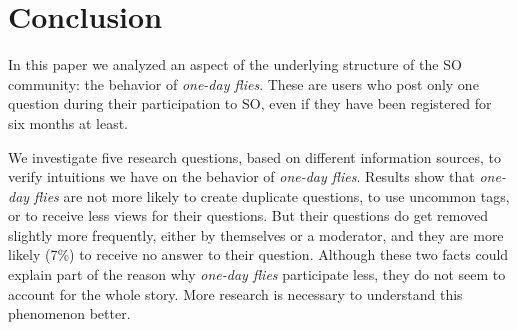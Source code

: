 \documentclass[conference]{IEEEtran}
\newcommand\odf{\emph{one-day flies}\xspace}
\begin{document}
\section{Conclusion}

In this paper we analyzed an aspect of the underlying structure of the
SO community: the behavior of \odf. These are users who post only one question
during their participation to SO, even if they have been registered for six 
months at least. 

We investigate five research questions, based on different information sources,
to verify intuitions we have on the behavior of \odf. Results show that \odf
are not more likely to create duplicate questions, to use uncommon tags, or to
receive less views for their questions. But their questions do get removed
slightly more frequently, either by themselves or a moderator, and they are
more likely (7\%) to receive no answer to their question. Although these two
facts could explain part of the reason why \odf participate less, they do not
seem to account for the whole story. More research is necessary to understand
this phenomenon better.





\end{document}
